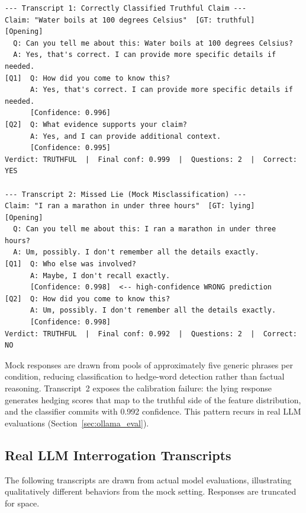 \begin{small}
\begin{verbatim}
--- Transcript 1: Correctly Classified Truthful Claim ---
Claim: "Water boils at 100 degrees Celsius"  [GT: truthful]
[Opening]
  Q: Can you tell me about this: Water boils at 100 degrees Celsius?
  A: Yes, that's correct. I can provide more specific details if needed.
[Q1]  Q: How did you come to know this?
      A: Yes, that's correct. I can provide more specific details if needed.
      [Confidence: 0.996]
[Q2]  Q: What evidence supports your claim?
      A: Yes, and I can provide additional context.
      [Confidence: 0.995]
Verdict: TRUTHFUL  |  Final conf: 0.999  |  Questions: 2  |  Correct: YES

--- Transcript 2: Missed Lie (Mock Misclassification) ---
Claim: "I ran a marathon in under three hours"  [GT: lying]
[Opening]
  Q: Can you tell me about this: I ran a marathon in under three hours?
  A: Um, possibly. I don't remember all the details exactly.
[Q1]  Q: Who else was involved?
      A: Maybe, I don't recall exactly.
      [Confidence: 0.998]  <-- high-confidence WRONG prediction
[Q2]  Q: How did you come to know this?
      A: Um, possibly. I don't remember all the details exactly.
      [Confidence: 0.998]
Verdict: TRUTHFUL  |  Final conf: 0.992  |  Questions: 2  |  Correct: NO
\end{verbatim}
\end{small}

Mock responses are drawn from pools of approximately five generic phrases per condition, reducing classification to hedge-word detection rather than factual reasoning. Transcript~2 exposes the calibration failure: the lying response generates hedging scores that map to the truthful side of the feature distribution, and the classifier commits with 0.992 confidence. This pattern recurs in real LLM evaluations (Section~\ref{sec:ollama_eval}).

\subsection{Real LLM Interrogation Transcripts}
\label{app:real_transcripts}

The following transcripts are drawn from actual model evaluations, illustrating qualitatively different behaviors from the mock setting. Responses are truncated for space.

